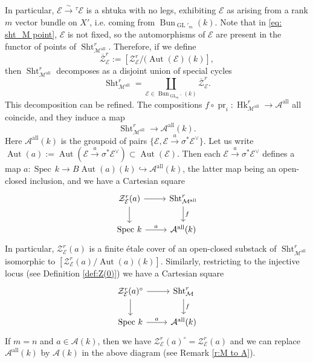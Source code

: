 \documentclass[reqno]{amsart}
\numberwithin{equation}{section}
\newcommand{\ol}[1]{\overline{#1}}
\newcommand{\Cal}[1]{\mathcal{#1}}
\newcommand{\ft}{{}^{\tau}}
\newcommand{\co}{\colon}
\newcommand{\mrm}[1]{\mathrm{#1}}
\DeclareMathOperator{\GL}{GL}
\DeclareMathOperator{\Aut}{Aut}
\DeclareMathOperator{\Spec}{Spec\,}
\DeclareMathOperator{\Bun}{Bun}
\DeclareMathOperator{\Sht}{Sht}
\DeclareMathOperator{\pr}{pr}
\DeclareMathOperator{\Hk}{Hk}
\DeclareMathOperator{\all}{all}
\newcommand{\incl}{\hookrightarrow}
\newcommand\cA{\mathcal{A}}
\newcommand\cE{\mathcal{E}}
\newcommand\cZ{\mathcal{Z}}
\theoremstyle{remark}
\numberwithin{equation}{section}
\begin{document}
In particular, $\Cal{E} \xrightarrow{\sim} \ft \Cal{E}$ is a shtuka with no legs, exhibiting $\Cal{E}$ as arising from a rank $m$ vector bundle on $X'$, i.e. coming from $\Bun_{\GL'_m}(k)$. Note that in \eqref{eq: sht_M point}, $\cE$ is not fixed, so the automorphisms of $\cE$ are present in the functor of points of $\Sht_{\Cal{M}^{\all}}^{r}$. Therefore, if we define
\[
\ol{\Cal{Z}}_{\Cal{E}}^{r} :=  [\Cal{Z}_{\Cal{E}}^{r} /  (\Aut(\cE)(k)],
\]
then $\Sht_{\Cal{M}^{\all}}^{r}$ decomposes as a disjoint union of special cycles
\begin{equation}\label{eq: hitchin shtuka decomposition E}
\Sht_{\Cal{M}^{\all}}^{r} = \coprod_{\Cal{E} \in \Bun_{\GL_{m}'}(k)} \ol{\Cal{Z}}_{\Cal{E}}^{r}.
\end{equation}
This decomposition can be refined.
The compositions $f \circ \pr_i \co \Hk_{\Cal{M}^{\all}}^{r} \rightarrow \Cal{A}^{\mrm{all}}$ all coincide, and they induce a map 
\begin{equation}\label{eq: hitchin shtuka decomposition A}
\Sht_{\Cal{M}^{\all}}^{r} \rightarrow \Cal{A}^{\mrm{all}}(k).
\end{equation}
Here $\cA^{\mrm{all}}(k)$ is the groupoid of pairs $\{\cE, \cE \xrightarrow{a} \sigma^* \cE^\vee\}$. Let us write $\Aut(a) := \Aut(\cE \xrightarrow{a} \sigma^* \cE^\vee)\subset \Aut(\cE)$. Then each $\cE \xrightarrow{a} \sigma^* \cE^\vee$ defines a map $a: \Spec k \to B \Aut(a)(k)\incl \cA^{\all}(k)$, the latter map being an open-closed inclusion, and we have a Cartesian square
\begin{equation}\label{eq: hitchin shtuka decomposition E and A}
\begin{tikzcd}
\cZ_{\cE}^r(a) \ar[r] \ar[d] & \Sht_{\Cal{M}^{\all}}^{r}  \ar[d, "f"] \\
\Spec k \ar[r, "a"] & \cA^{\mrm{all}}(k) 
\end{tikzcd}
\end{equation}
In particular, $\cZ_{\cE}^r(a)$ is a finite \'{e}tale cover of an open-closed substack of $\Sht_{\Cal{M}^{\all}}^{r}$ isomorphic to $[\cZ_{\cE}^r(a)/\Aut(a)(k)]$. 
Similarly, restricting to the injective locus (see Definition \ref{def:Z(0)}) we have a 
Cartesian square
\begin{equation}\label{eq: hitchin shtuka decomposition E and A inj}
\begin{tikzcd}
\cZ_{\cE}^r(a)^{\circ} \ar[r] \ar[d] & \Sht_{\Cal{M}}^{r}  \ar[d, "f"] \\
\Spec k \ar[r, "a"] & \cA^{\mrm{all}}(k) 
\end{tikzcd}
\end{equation}
If $m=n$ and $a\in \cA(k)$, then we have $\cZ_{\cE}^r(a)^{\circ}=\cZ_{\cE}^r(a)$ and we can replace $ \cA^{\mrm{all}}(k)$ by $ \cA(k)$ in the above diagram (see Remark \ref{r:M to A}). 
\end{document}
